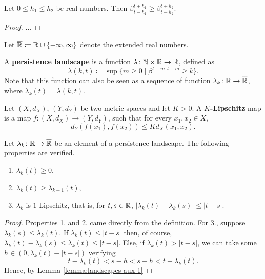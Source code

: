 \begin{lemma} \label{lemma:landscapes-aux-2}
    Let $ 0 \leq h_1 \leq h_2 $ be real numbers. Then $ \beta_{t-h_1}^{t+h_1} \geq \beta_{t-h_2}^{t+h_2} $.
\end{lemma}
\begin{proof}
    ...
\end{proof}

Let $ \overline{\mathbb R} \coloneq \mathbb R \cup \{-\infty, \infty\} $ denote the extended real numbers. 

\begin{definition} \label{def:persistence-landscape}
    A {\bf persistence landscape} is a function $ \lambda \colon \mathbb N \times \mathbb R \to \overline {\mathbb R} $, defined as
    \begin{equation}
        \lambda(k, t) \coloneq \sup \{ m \geq 0 \mid \beta^{t-m, t+m} \geq k\}.
    \end{equation}
    Note that this function can also be seen as a sequence of function $ \lambda_k \colon \mathbb R \to \overline{\mathbb R} $, where $ \lambda_k(t) = \lambda(k, t) $.
\end{definition}

\begin{definition}[$K$-Lipschitz]
    Let $ (X, d_X) $, $ (Y, d_Y) $ be two metric spaces and let $ K > 0 $. A {\bf $K$-Lipschitz} map is a map $ f \colon (X, d_X) \to (Y, d_Y) $, such that for every $ x_1, x_2 \in X $, 
    \begin{equation}
        d_Y(f(x_1), f(x_2)) \leq K d_X(x_1, x_2).
    \end{equation}
\end{definition}

\begin{lemma} \label{lemma:landscapes-aux-3}
    Let $ \lambda_k \colon \mathbb R \to \overline{\mathbb R} $ be an element of a persistence landscape. The following properties are verified.
    \begin{enumerate}
        \item $\lambda_k(t) \geq 0$,
        \item $\lambda_k(t) \geq \lambda_{k+1}(t)$,
        \item $\lambda_k$ is $1$-Lipschitz, that is, for $ t, s \in \mathbb R $, $ | \lambda_k(t) - \lambda_k(s) | \leq |t-s| $.
    \end{enumerate}
\end{lemma}
\begin{proof}
    Properties 1. and 2. came directly from the definition. For 3., suppose $ \lambda_k(s) \leq \lambda_k(t) $. If $ \lambda_k(t) \leq |t -s | $ then, of course, $ \lambda_k(t) - \lambda_k(s) \leq \lambda_k(t) \leq |t-s| $. Else, if $ \lambda_k(t) >  |t - s | $, we can take some $ h \in (0, \lambda_k(t) -  |t - s |) $ verifying
    \begin{equation}
        t - \lambda_k(t) < s- h < s + h < t + \lambda_k(t).
    \end{equation}
    Hence, by Lemma \ref{lemma:landscapes-aux-1}
\end{proof}

